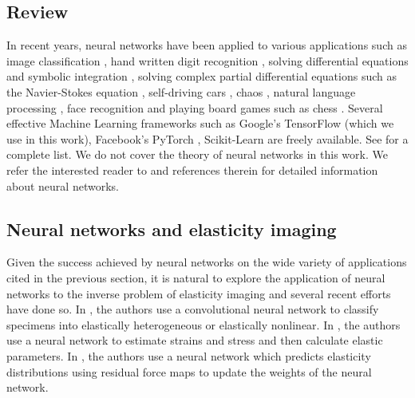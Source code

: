 \documentclass[10pt]{article}
\begin{document}
\subsection{Review}
In recent years, neural networks have been applied to various applications such as image classification \cite{paper:hinton2017}, hand written digit recognition \cite{paper:kulkarni2018}, solving differential equations and symbolic integration \cite{misc:lample2019}, solving complex partial differential equations such as the Navier-Stokes equation \cite{misc:anandkumar2020}, self-driving cars \cite{misc:agnihotri2019,misc:nvidiaselfdriving2016}, chaos \cite{paper:pathak2018}, natural language processing \cite{misc:googlenlp}, face recognition \cite{conf:taigman2014} and playing board games such as chess \cite{paper:alphazero}. Several effective Machine Learning frameworks such as Google's TensorFlow \cite{misc:tensorflow} (which we use in this work), Facebook's PyTorch \cite{incollect:pytorch}, Scikit-Learn \cite{paper:scikit-learn} are freely available. See \cite{misc:compdeep} for a complete list. We do not cover the theory of neural networks in this work. We refer the interested reader to \cite{book:aggarwal,book:goodfellow,book:chollet,misc:cs231n,misc:andrewng,misc:udemy} and references therein for detailed information about neural networks.
\subsection{Neural networks and elasticity imaging}
Given the success achieved by neural networks on the wide variety of applications cited in the previous section, it is natural to explore the application of neural networks to the inverse problem of elasticity imaging and several recent efforts \cite{paper:pateloberai2019,misc:gu2020,paper:hoeriginsana2016} have done so. In \cite{paper:pateloberai2019}, the authors use a convolutional neural network to classify specimens into elastically heterogeneous or elastically nonlinear. In \cite{paper:hoeriginsana2016}, the authors use a neural network to estimate strains and stress and then calculate elastic parameters. In \cite{misc:gu2020}, the authors use a neural network which predicts elasticity distributions using residual force maps to update the weights of the neural network.
\end{document}
